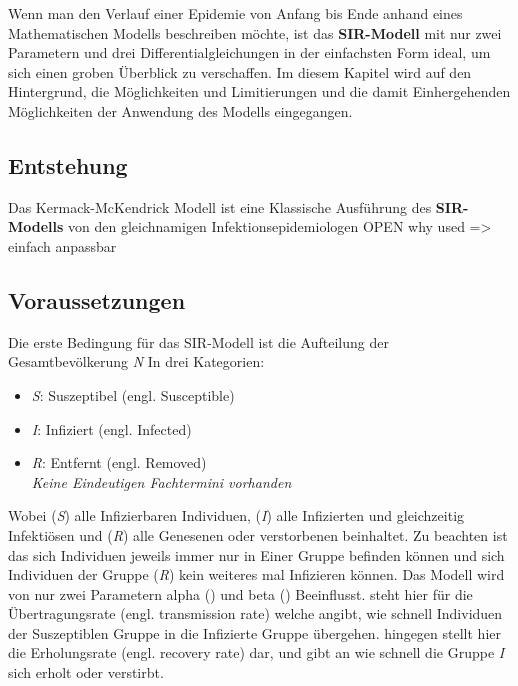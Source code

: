 \documentclass[12pt]{scrartcl} %
\begin{document}
Wenn man den Verlauf einer Epidemie von Anfang bis Ende anhand eines Mathematischen Modells beschreiben möchte, ist das \textbf{SIR-Modell} 
mit nur zwei Parametern und drei Differentialgleichungen in der einfachsten Form ideal, um sich einen groben Überblick zu verschaffen. \cite[vgl.]{4}
Im diesem Kapitel wird auf den Hintergrund, die Möglichkeiten und Limitierungen und die damit Einhergehenden Möglichkeiten der Anwendung des Modells eingegangen.

\subsection{Entstehung}

Das Kermack-McKendrick Modell ist eine Klassische Ausführung des \textbf{SIR-Modells} von den gleichnamigen Infektionsepidemiologen OPEN
why used => einfach anpassbar


\subsection{Voraussetzungen}

Die erste Bedingung für das SIR-Modell ist die Aufteilung der Gesamtbevölkerung \textit{N} In drei Kategorien:

\begin{itemize}
	\item \textit{S}: Suszeptibel (engl. Susceptible)
	\item \textit{I}: Infiziert (engl. Infected)
	\item \textit{R}: Entfernt (engl. Removed)\\
	\small \textsl{Keine Eindeutigen Fachtermini vorhanden}
\end{itemize}
\normalsize

Wobei (\textit{S}) alle Infizierbaren Individuen, (\textit{I}) alle Infizierten und gleichzeitig Infektiösen und (\textit{R}) alle Genesenen oder verstorbenen beinhaltet.  Zu beachten ist das sich Individuen jeweils immer nur in Einer Gruppe befinden können und sich Individuen der Gruppe 
(\textit{R}) kein weiteres mal Infizieren können. \cite[vgl.]{4}
Das Modell wird von nur zwei Parametern alpha (\textalpha) und beta (\textbeta) Beeinflusst. 
\textalpha \space steht hier für die Übertragungsrate (engl. transmission rate) welche angibt, wie schnell Individuen der Suszeptiblen Gruppe in die Infizierte Gruppe übergehen. 
\textbeta \space hingegen stellt hier die Erholungsrate (engl. recovery rate) dar, und gibt an wie schnell die Gruppe \textit{I} sich erholt oder verstirbt.
\end{document}
